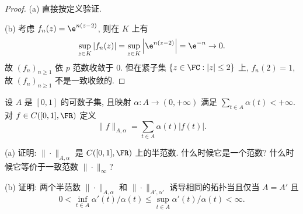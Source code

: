 \begin{proof}
    (a) 直接按定义验证.

    (b) 考虑 $f_n(z)=\e^{n(z-2)}$, 则在 $K$ 上有
    \[\sup_{z\in K}|f_n(z)|=\sup_{z\in K}\left|\e^{n(z-2)}\right|=\e^{-n}\to 0.\]
    故 $(f_n)_{n\geq 1}$ 依 $p$ 范数收敛于 $0$.
    但在紧子集 $\{z\in\FC: |z|\leq 2\}$ 上, $f_n(2)=1$, 故 $(f_n)_{n\geq 1}$ 不是一致收敛的.
\end{proof}



\begin{exercise}
    设 $A$ 是 $[0,1]$ 的可数子集, 且映射 $\alpha: A \rightarrow(0,+\infty)$ 
    满足 $\sum_{t\in A}\alpha(t)<+\infty$. 对 $f\in C([0,1],\FR)$ 定义
    \[\|f\|_{A,\alpha}=\sum_{t\in A}\alpha(t)|f(t)|.\]

    (a) 证明: $\|\cdot\|_{A,\alpha}$ 是 $C([0,1],\FR)$ 上的半范数. 什么时候它是一个范数? 
    什么时候它等价于一致范数 $\|\cdot\|_{\infty}$?

    (b) 证明: 两个半范数 $\|\cdot\|_{A, \alpha}$ 和 $\|\cdot\|_{A',\alpha'}$ 诱导相同的拓扑当且仅当 $A=A'$ 且
    \[
    0<\inf_{t\in A} \alpha'(t)/\alpha(t)\leqslant \sup_{t\in A} \alpha'(t)/\alpha(t)<\infty.
    \]
\end{exercise}

